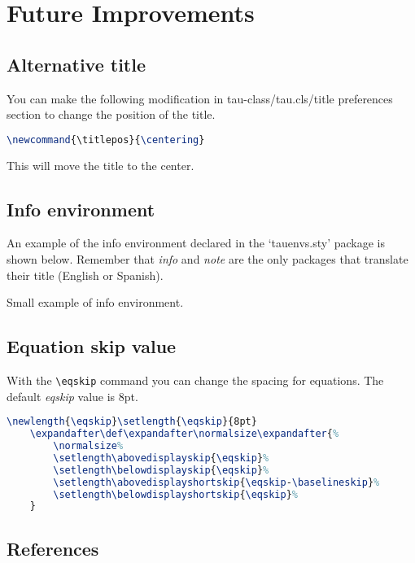 \documentclass[9pt,a4paper,twoside]{tau-class/tau}
\begin{document}
\section{Future Improvements}

    \subsection{Alternative title}

        You can make the following modification in tau-class/tau.cls/title preferences section to change the position of the title.

\nolinenumbers
\begin{lstlisting}[language=TeX, caption=Alternative title.]
\newcommand{\titlepos}{\centering}
\end{lstlisting}
\linenumbers

	This will move the title to the center. 

    \subsection{Info environment}

        An example of the info environment declared in the ‘tauenvs.sty’ package is shown below. Remember that \textit{info} and \textit{note} are the only packages that translate their title (English or Spanish).
		
	\begin{info}
		Small example of info environment.
	\end{info}

    \subsection{Equation skip value}

        With the \verb|\eqskip| command you can change the spacing for equations. The default \textit{eqskip} value is 8pt.

\nolinenumbers
\begin{lstlisting}[language=TeX, caption=Equation skip code.]
\newlength{\eqskip}\setlength{\eqskip}{8pt}
	\expandafter\def\expandafter\normalsize\expandafter{%
		\normalsize%
		\setlength\abovedisplayskip{\eqskip}%
		\setlength\belowdisplayskip{\eqskip}%
		\setlength\abovedisplayshortskip{\eqskip-\baselineskip}%
		\setlength\belowdisplayshortskip{\eqskip}%
	}
\end{lstlisting}
\linenumbers
		
    \subsection{References}
		
\end{document}
